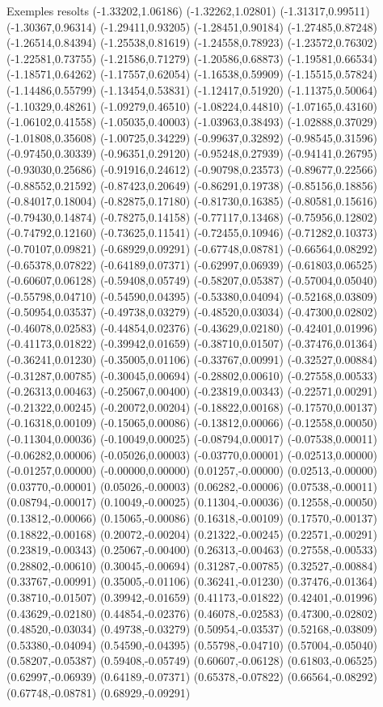 \documentclass[11pt,a4paper]{article}
\begin{document}
\begin{fmex}{Exemples resolts}
(-1.33202,1.06186) (-1.32262,1.02801) (-1.31317,0.99511) (-1.30367,0.96314) (-1.29411,0.93205) (-1.28451,0.90184) (-1.27485,0.87248) (-1.26514,0.84394) (-1.25538,0.81619) (-1.24558,0.78923) (-1.23572,0.76302) (-1.22581,0.73755) (-1.21586,0.71279) (-1.20586,0.68873) (-1.19581,0.66534) (-1.18571,0.64262) (-1.17557,0.62054) (-1.16538,0.59909) (-1.15515,0.57824) (-1.14486,0.55799) (-1.13454,0.53831) (-1.12417,0.51920) (-1.11375,0.50064) (-1.10329,0.48261) (-1.09279,0.46510) (-1.08224,0.44810) (-1.07165,0.43160) (-1.06102,0.41558) (-1.05035,0.40003) (-1.03963,0.38493) (-1.02888,0.37029) (-1.01808,0.35608) (-1.00725,0.34229) (-0.99637,0.32892) (-0.98545,0.31596) (-0.97450,0.30339) (-0.96351,0.29120) (-0.95248,0.27939) (-0.94141,0.26795) (-0.93030,0.25686) (-0.91916,0.24612) (-0.90798,0.23573) (-0.89677,0.22566) (-0.88552,0.21592) (-0.87423,0.20649) (-0.86291,0.19738) (-0.85156,0.18856) (-0.84017,0.18004) (-0.82875,0.17180) (-0.81730,0.16385) (-0.80581,0.15616) (-0.79430,0.14874) (-0.78275,0.14158) (-0.77117,0.13468) (-0.75956,0.12802) (-0.74792,0.12160) (-0.73625,0.11541) (-0.72455,0.10946) (-0.71282,0.10373) (-0.70107,0.09821) (-0.68929,0.09291) (-0.67748,0.08781) (-0.66564,0.08292) (-0.65378,0.07822) (-0.64189,0.07371) (-0.62997,0.06939) (-0.61803,0.06525) (-0.60607,0.06128) (-0.59408,0.05749) (-0.58207,0.05387) (-0.57004,0.05040) (-0.55798,0.04710) (-0.54590,0.04395) (-0.53380,0.04094) (-0.52168,0.03809) (-0.50954,0.03537) (-0.49738,0.03279) (-0.48520,0.03034) (-0.47300,0.02802) (-0.46078,0.02583) (-0.44854,0.02376) (-0.43629,0.02180) (-0.42401,0.01996) (-0.41173,0.01822) (-0.39942,0.01659) (-0.38710,0.01507) (-0.37476,0.01364) (-0.36241,0.01230) (-0.35005,0.01106) (-0.33767,0.00991) (-0.32527,0.00884) (-0.31287,0.00785) (-0.30045,0.00694) (-0.28802,0.00610) (-0.27558,0.00533) (-0.26313,0.00463) (-0.25067,0.00400) (-0.23819,0.00343) (-0.22571,0.00291) (-0.21322,0.00245) (-0.20072,0.00204) (-0.18822,0.00168) (-0.17570,0.00137) (-0.16318,0.00109) (-0.15065,0.00086) (-0.13812,0.00066) (-0.12558,0.00050) (-0.11304,0.00036) (-0.10049,0.00025) (-0.08794,0.00017) (-0.07538,0.00011) (-0.06282,0.00006) (-0.05026,0.00003) (-0.03770,0.00001) (-0.02513,0.00000) (-0.01257,0.00000) (-0.00000,0.00000) (0.01257,-0.00000) (0.02513,-0.00000) (0.03770,-0.00001) (0.05026,-0.00003) (0.06282,-0.00006) (0.07538,-0.00011) (0.08794,-0.00017) (0.10049,-0.00025) (0.11304,-0.00036) (0.12558,-0.00050) (0.13812,-0.00066) (0.15065,-0.00086) (0.16318,-0.00109) (0.17570,-0.00137) (0.18822,-0.00168) (0.20072,-0.00204) (0.21322,-0.00245) (0.22571,-0.00291) (0.23819,-0.00343) (0.25067,-0.00400) (0.26313,-0.00463) (0.27558,-0.00533) (0.28802,-0.00610) (0.30045,-0.00694) (0.31287,-0.00785) (0.32527,-0.00884) (0.33767,-0.00991) (0.35005,-0.01106) (0.36241,-0.01230) (0.37476,-0.01364) (0.38710,-0.01507) (0.39942,-0.01659) (0.41173,-0.01822) (0.42401,-0.01996) (0.43629,-0.02180) (0.44854,-0.02376) (0.46078,-0.02583) (0.47300,-0.02802) (0.48520,-0.03034) (0.49738,-0.03279) (0.50954,-0.03537) (0.52168,-0.03809) (0.53380,-0.04094) (0.54590,-0.04395) (0.55798,-0.04710) (0.57004,-0.05040) (0.58207,-0.05387) (0.59408,-0.05749) (0.60607,-0.06128) (0.61803,-0.06525) (0.62997,-0.06939) (0.64189,-0.07371) (0.65378,-0.07822) (0.66564,-0.08292) (0.67748,-0.08781) (0.68929,-0.09291) 
\end{fmex}
\end{document}
